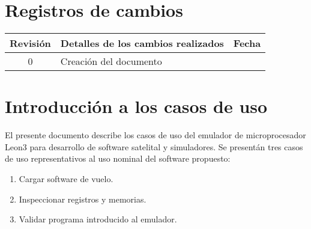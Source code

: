 \documentclass[
  11pt, %
  codirector, %
]{charter}
\begin{document}
\maketitle
\tableofcontents

\newpage

\section*{Registros de cambios}
\label{sec:registro}


\begin{table}[ht]
	\label{tab:registro}
	\centering
	\begin{tabularx}{\linewidth}{@{}|c|X|c|@{}}
		\hline
		\rowcolor[HTML]{C0C0C0}
		Revisión & \multicolumn{1}{c|}{\cellcolor[HTML]{C0C0C0}Detalles de los cambios realizados} & Fecha      \\ \hline
		0      & Creación del documento                                 &\fechaInicioName \\ \hline
		\hline

	\end{tabularx}
	\label{sec:cierre}
\end{table}

\pagebreak


\section{Introducción a los casos de uso}
\label{sec:org60390fa}

El presente documento describe los casos de uso del emulador de microprocesador Leon3 para desarrollo de software satelital y simuladores. Se presentán tres casos de uso representativos al uso nominal del software propuesto:

\begin{enumerate}
\item Cargar software de vuelo.
\item Inspeccionar registros y memorias.
\item Validar programa introducido al emulador.
\end{enumerate}

\end{document}
